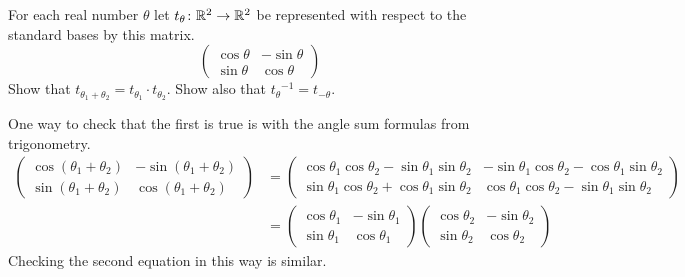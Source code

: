 \begin{exercises}
    For each real number \( \theta \) let
    \( \mbox{$t_\theta\colon \mathbb{R}^2\to \mathbb{R}^2$} \) be represented with respect to the
    standard bases by this matrix.
    \begin{equation*}
      \begin{pmatrix}
         \cos\theta  &-\sin\theta  \\
         \sin\theta  &\cos\theta
      \end{pmatrix}
    \end{equation*}
    Show that \( t_{\theta_1+\theta_2}=t_{\theta_1}\cdot t_{\theta_2} \).
    Show also that \( {t_{\theta}}^{-1}=t_{-\theta} \).
    \begin{answer}
      One way to check that the first is true is with
      the angle sum formulas from trigonometry.
      \begin{align*}
        \begin{pmatrix}
          \cos(\theta_1+\theta_2) &-\sin(\theta_1+\theta_2)  \\
          \sin(\theta_1+\theta_2) &\cos(\theta_1+\theta_2)
        \end{pmatrix}
        &=\begin{pmatrix}
          \cos\theta_1\cos\theta_2-\sin\theta_1\sin\theta_2
            &-\sin\theta_1\cos\theta_2-\cos\theta_1\sin\theta_2  \\
          \sin\theta_1\cos\theta_2+\cos\theta_1\sin\theta_2
            &\cos\theta_1\cos\theta_2-\sin\theta_1\sin\theta_2
        \end{pmatrix}                                                    \\
        &=\begin{pmatrix}
          \cos\theta_1 &-\sin\theta_1  \\
          \sin\theta_1 &\cos\theta_1
        \end{pmatrix}
        \begin{pmatrix}
          \cos\theta_2 &-\sin\theta_2  \\
          \sin\theta_2 &\cos\theta_2
        \end{pmatrix}
      \end{align*}
      Checking the second equation in this way is similar.


\end{answer}
\end{exercises}
